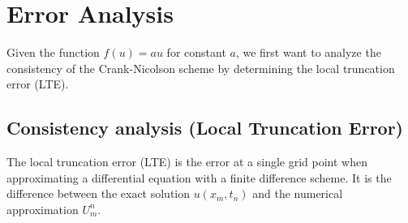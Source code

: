 \section{Error Analysis}
Given the function \(f(u) = au\) for constant \(a\), we first want to analyze the consistency of the Crank-Nicolson scheme by determining the local truncation error (LTE).

\subsection{Consistency analysis (Local Truncation Error)}
The local truncation error (LTE) is the error at a single grid point when approximating a differential equation with a finite difference scheme.
It is the difference between the exact solution \(u(x_m, t_n)\) and the numerical approximation \(U_m^n\).

